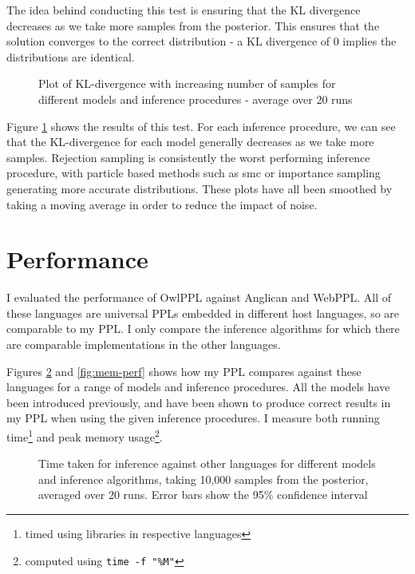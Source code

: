 The idea behind conducting this test is ensuring that the KL divergence decreases as we take more samples from the posterior. This ensures that the solution converges to the correct distribution - a KL divergence of 0 implies the distributions are identical. 
				
\begin{figure}[H]
	\centering
	
	\caption{Plot of KL-divergence with increasing number of samples for different models and inference procedures - average over 20 runs}
	\label{fig:kl}
\end{figure}
				
Figure \ref{fig:kl} shows the results of this test. For each inference procedure, we can see that the KL-divergence for each model generally decreases as we take more samples. Rejection sampling is consistently the worst performing inference procedure, with particle based methods such as smc or importance sampling generating more accurate distributions. These plots have all been smoothed by taking a moving average in order to reduce the impact of noise.
				
				
				
\section{Performance}
				
I evaluated the performance of OwlPPL against Anglican and WebPPL. All of these languages are universal PPLs embedded in different host languages, so are comparable to my PPL. I only compare the inference algorithms for which there are comparable implementations in the other languages.
				
Figures \ref{fig:time-perf} and \ref{fig:mem-perf} shows how my PPL compares against these languages for a range of models and inference procedures. All the models have been introduced previously, and have been shown to produce correct results in my PPL when using the given inference procedures. I measure both running time\footnote{timed using libraries in respective languages} and peak memory usage\footnote{computed using \texttt{time -f "\%M"}}.
				
\begin{figure}[!ht]
	\centering
	
	\caption{Time taken for inference against other languages for different models and inference algorithms, taking 10,000 samples from the posterior, averaged over 20 runs. Error bars show the 95\% confidence interval}
	\label{fig:time-perf}
\end{figure}
				
